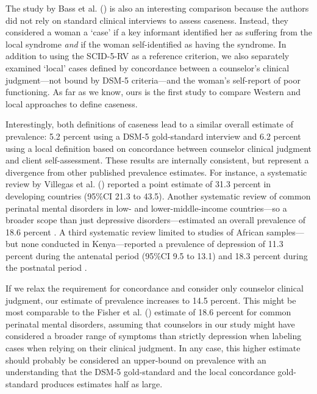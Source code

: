 \documentclass[man,natbib,longtable]{apa6}\usepackage[]{graphicx}\usepackage[]{color}
\begin{document}
The study by Bass et al. (\citeyear{Bass:2008}) is also an interesting comparison because the authors did not rely on standard clinical interviews to assess caseness. Instead, they considered a woman a `case' if a key informant identified her as suffering from the local syndrome \textit{and} if the woman self-identified as having the syndrome. In addition to using the SCID-5-RV as a reference criterion, we also separately examined `local' cases defined by concordance between a counselor's clinical judgment---not bound by DSM-5 criteria---and the woman's self-report of poor functioning. As far as we know, ours is the first study to compare Western and local approaches to define caseness.

Interestingly, both definitions of caseness lead to a similar overall estimate of prevalence: 5.2 percent using a DSM-5 gold-standard interview and 6.2 percent using a local definition based on concordance between counselor clinical judgment and client self-assessment. These results are internally consistent, but represent a divergence from other published prevalence estimates. For instance, a systematic review by Villegas et al. (\citeyear{Villegas:2011}) reported a point estimate of 31.3 percent in developing countries (95\%CI 21.3 to 43.5). Another systematic review of common perinatal mental disorders in low- and lower-middle-income countries---so a broader scope than just depressive disorders---estimated an overall prevalence of 18.6 percent \citep[95\%CI 18.0 to 19.2;][]{Fisher:2012}. A third systematic review limited to studies of African samples---but none conducted in Kenya---reported a prevalence of depression of 11.3 percent during the antenatal period (95\%CI 9.5 to 13.1) and 18.3 percent during the postnatal period \citep[95\%CI 17.5 to 19.1;][]{Sawyer:2010}.

If we relax the requirement for concordance and consider only counselor clinical judgment, our estimate of prevalence increases to 14.5 percent. This might be most comparable to the Fisher et al. (\citeyear{Fisher:2012}) estimate of 18.6 percent for common perinatal mental disorders, assuming that counselors in our study might have considered a broader range of symptoms than strictly depression when labeling cases when relying on their clinical judgment. In any case, this higher estimate should probably be considered an upper-bound on prevalence with an understanding that the DSM-5 gold-standard and the local concordance gold-standard produces estimates half as large.
\end{document}
